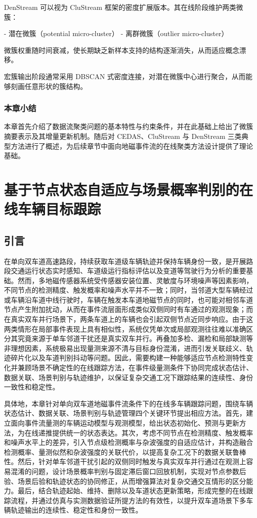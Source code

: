 \documentclass{xdupgthesis}
\begin{document}
DenStream 可以视为 CluStream 框架的密度扩展版本。其在线阶段维护两类微簇：

- 潜在微簇（potential micro-cluster）
- 离群微簇（outlier micro-cluster）

微簇权重随时间衰减，使长期缺乏新样本支持的结构逐渐消失，从而适应概念漂移。

宏簇输出阶段通常采用 DBSCAN 式密度连接，对潜在微簇中心进行聚合，从而能够刻画任意形状的簇结构。



\subsection{本章小结}

本章首先介绍了数据流聚类问题的基本特性与约束条件，并在此基础上给出了微簇摘要表示及其增量更新机制。随后对 CEDAS、CluStream 与 DenStream 三类典型方法进行了概述，为后续章节中面向地磁事件流的在线聚类方法设计提供了理论基础。


\chapter{基于节点状态自适应与场景概率判别的在线车辆目标跟踪}
\label{chap:online_tracking}

\section{引言}

在单向双车道高速路段，持续获取车道级车辆轨迹并保持车辆身份一致，是开展路段交通运行状态实时感知、车道级运行指标评估以及变道等驾驶行为分析的重要基础。然而，多地磁传感器系统受传感器安装位置、灵敏度与环境噪声等因素影响，不同节点的检测精度、触发概率和噪声水平并不一致；同时，当邻道大型车辆经过或车辆沿车道中线行驶时，车辆在触发本车道地磁节点的同时，也可能对相邻车道节点产生附加扰动，从而在事件流层面形成类似双侧同时有车通过的观测现象；而在真实双车并行场景下，两条车道上的车辆也会引起双侧节点近同步响应。由于这两类情形在局部事件表现上具有相似性，系统仅凭单次或局部观测往往难以准确区分其究竟来源于单车邻道干扰还是真实双车并行。再叠加多检、漏检和局部缺测等非理想因素，系统极易出现量测来源不清与目标身份混淆，进而引发关联歧义、轨迹碎片化以及车道判别抖动等问题。因此，需要构建一种能够适应节点检测特性变化并兼顾场景不确定性的在线跟踪方法，在事件级量测条件下协同完成状态估计、数据关联、场景判别与轨迹维护，以保证复杂交通工况下跟踪结果的连续性、身份一致性和稳定性。

具体地，本章针对单向双车道地磁事件流条件下的在线多车辆跟踪问题，围绕车辆状态估计、数据关联、场景判别与轨迹管理四个关键环节提出相应方法。首先，建立面向事件流量测的车辆运动模型与观测模型，给出状态初始化、预测与更新方法，为在线递推提供统一的状态表达。其次，考虑不同节点在检测精度、触发概率和噪声水平上的差异，引入节点级检测概率与杂波强度的自适应估计，并构造融合检测概率、量测似然和杂波强度的关联代价，以提高复杂工况下的数据关联鲁棒性。然后，针对单车邻道干扰引起的双侧同时触发与真实双车并行通过在观测上容易混淆的问题，设计场景概率判别与固定滞后窗口回放机制，实现对节点参数后验、场景后验和轨迹状态的协同修正，从而增强算法对复杂交通交互情形的区分能力。最后，结合轨迹起始、维持、删除以及车道状态更新策略，形成完整的在线跟踪流程，并通过仿真与实测数据验证所提方法的有效性，以提升双车道场景下多车辆轨迹输出的连续性、稳定性和身份一致性。
\end{document}
